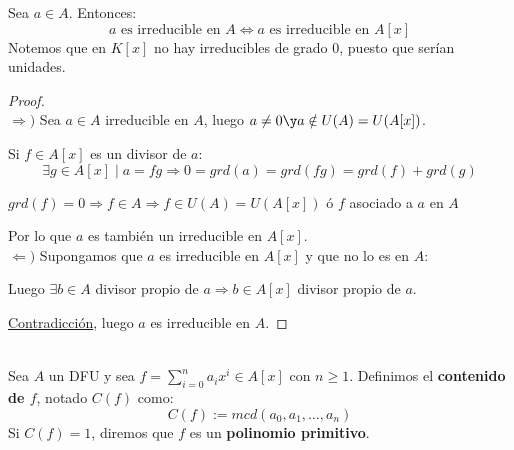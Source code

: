 \begin{prop}
    Sea $a \in A$. Entonces:
    $$a \mbox{ es irreducible en } A \Leftrightarrow a \mbox{ es irreducible en } A[x]$$
    Notemos que en $K[x]$ no hay irreducibles de grado 0, puesto que serían unidades.
\begin{proof}
    \ \\
    $\Longrightarrow)$ Sea $a \in A$ irreducible en $A$, luego $a \neq 0 \y a \notin U(A) = U(A[x])$.\par
    Si $f \in A[x]$ es un divisor de $a$:
    $$\exists g \in A[x] \mid a=fg \Rightarrow 0 = grd(a) = grd(fg) = grd(f) + grd(g)$$

    $ grd(f) = 0 \Rightarrow f \in A \Rightarrow f \in U(A) = U(A[x])$ ó $f$ asociado a $a$ en $A$\par
    Por lo que $a$ es también un irreducible en $A[x]$.\\

    
    $\Longleftarrow)$ Supongamos que $a$ es irreducible en $A[x]$ y que no lo es en $A$:\par
    Luego $\exists b \in A$ divisor propio de $a \Rightarrow b \in A[x]$ divisor propio de $a$. \par
    \underline{Contradicción}, luego $a$ es irreducible en $A$.
\end{proof}
\end{prop}

\begin{definicion}
    \ \\
    Sea $A$ un DFU y sea $\displaystyle f=\sum_{i=0}^n a_i x^i \in A[x]$ con $n \geq 1$. Definimos el \textbf{contenido
        de $f$}, notado $C(f)$ como:
    $$C(f):=mcd(a_0,a_1, \ldots, a_n)$$
    Si $C(f)=1$, diremos que $f$ es un \textbf{polinomio primitivo}.
\end{definicion}

